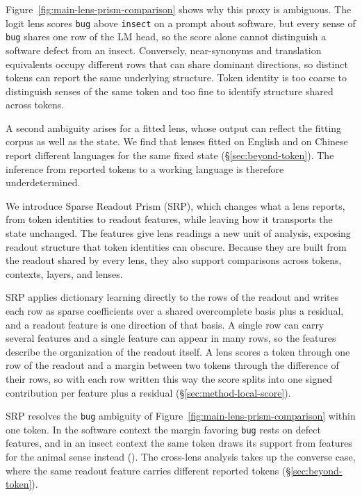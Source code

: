 Figure~\ref{fig:main-lens-prism-comparison} shows why this proxy is
ambiguous. The logit
lens scores \texttt{bug} above \texttt{insect} on a prompt about
software, but every sense of \texttt{bug} shares one row of the LM head, so the
score alone cannot distinguish a software defect from an insect.
Conversely, near-synonyms and translation equivalents occupy different
rows that can share dominant directions, so distinct tokens can report
the same underlying structure. Token identity is too coarse to
distinguish senses of the same token and too fine to identify structure
shared across tokens.

A second ambiguity arises for a fitted lens, whose output can reflect
the fitting corpus as well as the state. We find that
lenses fitted on English and on Chinese report different languages
for the same fixed state (\S\ref{sec:beyond-token}). The inference from
reported tokens to a working language is therefore underdetermined.

We introduce Sparse Readout Prism (SRP), which changes what a lens
reports, from token identities to readout features, while leaving how
it transports the state unchanged. The features give lens readings a
new unit of analysis, exposing readout structure that token
identities can obscure. Because they are built from the readout shared
by every lens, they also support comparisons across tokens, contexts,
layers, and lenses.

SRP applies dictionary learning directly to the rows of the readout
and writes each row
as sparse coefficients over a shared overcomplete basis plus a
residual, and a readout feature is one direction of that basis. A single row can carry several features and a single feature can
appear in many rows, so the features describe the organization of the readout itself. A lens scores a token
through one row of the readout and a margin between two tokens through
the difference of their rows, so with each row written this way the
score splits into one signed contribution per feature plus a residual
(\S\ref{sec:method-local-score}).

SRP resolves the \texttt{bug} ambiguity of
Figure~\ref{fig:main-lens-prism-comparison} within one token. In the
software context the margin favoring \texttt{bug} rests on defect
features, and in an insect context the same token draws its support from
features for the animal sense instead
(). The
cross-lens analysis takes up the converse case, where the same
readout feature carries different reported tokens
(\S\ref{sec:beyond-token}).


